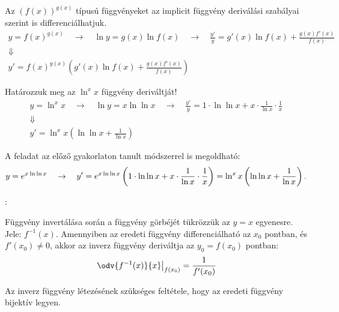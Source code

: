 \documentclass[a4paper, 12pt]{scrartcl}
\begin{document}
\begin{note}
  Az $(f(x))^{g(x)}$ típusú függvényeket az implicit függvény deriválási
  szabályai szerint is differenciálhatjuk.
  \begin{gather*}
    y = f(x)^{g(x)}
    \quad \rightarrow \quad
    \ln y = g(x) \ln f(x)
    \quad \rightarrow \quad
    \frac{y'}{y} = g'(x) \ln f(x) + \frac{g(x) f'(x)}{f(x)}
    \\
    \Downarrow
    \\
    y' = f(x)^{g(x)} \left( g'(x) \ln f(x) + \frac{g(x) f'(x)}{f(x)} \right)
  \end{gather*}
\end{note}

\begin{note}
  Határozzuk meg az $\ln^x x$ függvény deriváltját!
  \begin{gather*}
    y = \ln^x x
    \quad \rightarrow \quad
    \ln y = x \ln \ln x
    \quad \rightarrow \quad
    \frac{y'}{y} = 1 \cdot \ln \ln x + x \cdot \frac{1}{\ln x} \cdot \frac{1}{x}
    \\
    \Downarrow
    \\
    y' = \ln^x x \left( \ln \ln x + \frac{1}{\ln x} \right)
  \end{gather*}

  A feladat az előző gyakorlaton tanult módszerrel is megoldható:
  \[
    y = e^{x \ln \ln x}
    \quad \rightarrow \quad
    y' = e^{x \ln \ln x} \left( 1 \cdot \ln \ln x + x \cdot \frac{1}{\ln x} \cdot \frac{1}{x} \right)
    = \ln^x x \left( \ln \ln x + \frac{1}{\ln x} \right)
    \text.
  \]
\end{note}

\begin{blueBox}
  :

  Függvény invertálása során a függvény görbéjét tükrözzük az $y = x$ egyenesre.
  Jele: $f^{-1}(x)$. Amennyiben az eredeti függvény differenciálható az $x_0$
  pontban, és $f'(x_0) \neq 0$, akkor az inverz függvény deriváltja az
  $y_0 = f(x_0)$ pontban:
  \[
    \left. \odv{f^{-1}(x)}{x} \right|_{f(x_0)} = \frac{1}{f'(x_0)}
  \]
\end{blueBox}

\begin{note}
  Az inverz függvény létezésének szükséges feltétele, hogy az eredeti függvény
  bijektív legyen.
\end{note}
\end{document}
